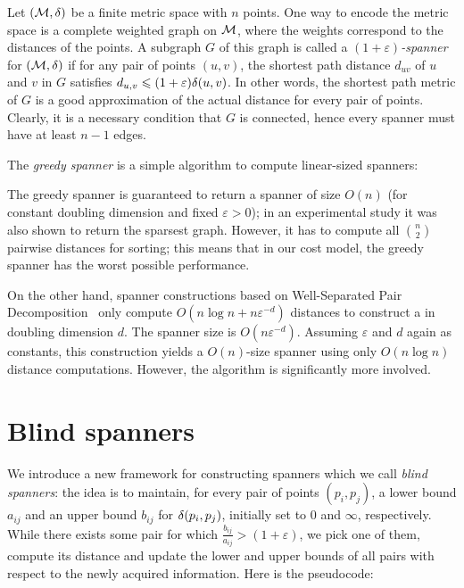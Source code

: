 \documentclass[]{ws-ijcga}
\renewcommand{\leq}{\leqslant}
\newcommand{\eps}{\varepsilon}
\begin{document}
%
Let $(\mathcal{M}, \delta)$ be a finite metric space with $n$ points. 
One way to encode the metric space is a complete weighted graph on $\mathcal{M}$,
where the weights correspond to the distances of the points.
A subgraph $G$ of this graph is called a \emph{$(1+\eps)$-spanner} for $(\mathcal{M},\delta)$ 
if for any pair of points $(u,v)$,
the shortest path distance $d_{uv}$ of $u$ and $v$ in $G$ satisfies $d_{u,v}\leq (1+\eps)\dist(u,v)$.
In other words, the shortest path metric of $G$ is a good approximation of the actual distance for every pair of points.
Clearly, it is a necessary condition that $G$ is connected, hence every spanner must have at least $n-1$ edges.

The \emph{greedy spanner} \cite{althofer1993sparse} is a simple algorithm to compute linear-sized spanners:
\begin{algorithmic}
\label{alg:greedy_spanner}
\Function{GreedySpanner}{$P, \eps$}
    \If{$d_{ij}>(1+\eps)\dist(p_i,p_j)$}
    \EndIf
    \EndFor
\EndFunction
\end{algorithmic}

The greedy spanner is guaranteed \cite{althofer1993sparse} to return a spanner of size $O(n)$
(for constant doubling dimension and fixed $\eps>0$); in an experimental study \cite{farshi2009experimental}
it was also shown to return the sparsest graph.  However, it
has to compute all $\binom{n}{2}$ pairwise distances for sorting;
this means that in our cost model, the greedy spanner has the worst possible
performance.

On the other hand, spanner constructions based on Well-Separated Pair Decomposition~\cite{cal-kos-wspd,hm-fast} only compute
$O(n\log n+n \eps^{-d})$ distances 
to construct a \espanner in doubling dimension $d$.
The spanner size is $O(n\eps^{-d})$. Assuming $\eps$ and $d$ again as constants,
this construction yields a $O(n)$-size spanner using only $O(n\log n)$ distance
computations. However, the algorithm is significantly more involved.

\section{Blind spanners}
\label{sec:blind_spanners}
%
We introduce a new framework for constructing spanners
which we call \emph{blind spanners}: the idea is to maintain,
for every pair of points $(p_i,p_j)$,
a lower bound $a_{ij}$ and an upper bound $b_{ij}$ for $\delta(p_i,p_j)$,
initially set to $0$ and $\infty$, respectively. While there exists some pair for which $\frac{b_{ij}}{a_{ij}}>(1+\eps)$,
we pick one of them, compute its distance and update the lower and upper bounds of
all pairs with respect to the newly acquired information. Here is the pseudocode:
\end{document}
